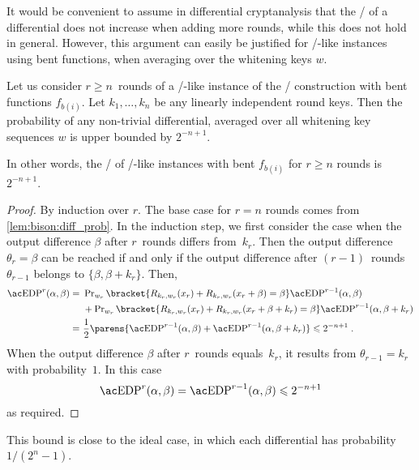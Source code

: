 It would be convenient to assume in differential cryptanalysis that the \EDP/ of a differential does not increase when adding more rounds, while this does not hold in general.
However, this argument can easily be justified for \bison/-like instances using bent functions, when averaging over the whitening keys $w$.
\begin{proposition}
    Let us consider $r \geqslant n$~rounds of a \bison/-like instance of the \WSN/ construction with bent functions $f_{b(i)}$.
    Let $k_1, \dots, k_n$ be any linearly independent round keys.
    Then the probability of any non-trivial differential, averaged over all whitening key sequences $w$ is upper bounded by $2^{-n + 1}$.

    In other words, the \MEDP/ of \bison/-like instances with bent $f_{b(i)}$ for $r \geqslant n$ rounds is $2^{-n+1}$.
\end{proposition}
\begin{proof}
    By induction over $r$.
    The base case for $r=n$ rounds comes from \cref{lem:bison:diff_prob}.
    In the induction step, we first consider the case when the output difference $\beta$ after $r$~rounds differs from~$k_{r}$.
    Then the output difference $\theta_{r} = \beta$ can be reached if and only if the output difference after $(r-1)$~rounds $\theta_{r-1}$ belongs to $\{\beta, \beta + k_{r}\}$.
    Then,
    \begin{align*}
        \mathrm{\EDP/}^r(\alpha, \beta) =\ &  \Prob_{w_r} \bracket{R_{k_{r},w_r}(x_r)+ R_{k_{r},w_r}(x_r+\beta) = \beta} \mathrm{\EDP/}^{r-1}(\alpha, \beta) \\
                                         & + \Prob_{w_r} \bracket{R_{k_{r},w_r}(x_r)+ R_{k_{r},w_r}(x_r+\beta+k_r) = \beta} \mathrm{\EDP/}^{r-1}(\alpha, \beta+k_r) \\
                                      =\ & \frac{1}{2} \parens{\mathrm{\EDP/}^{r-1}(\alpha, \beta) + \mathrm{\EDP/}^{r-1}(\alpha, \beta+k_r)} \leqslant 2^{-n+1}\;.
    \end{align*}
    When the output difference $\beta$ after $r$~rounds equals~$k_r$, it results from $\theta_{r-1}=k_r$ with probability~$1$.
    In this case
    \begin{equation*}
        \mathrm{\EDP/}^r(\alpha, \beta) = \mathrm{\EDP/}^{r-1}(\alpha, \beta) \leqslant 2^{-n+1}
    \end{equation*}
    as required.
\end{proof}
This bound is close to the ideal case, in which each differential has probability $1/(2^{n}-1)$.

